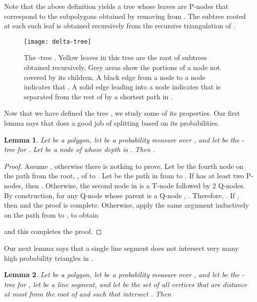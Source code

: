 \documentclass[lotsofwhite]{patmorin}
\newcommand{\figlabel}[1]{\label{fig:#1}}
\newtheorem{lem}{Lemma}{\bfseries}{\itshape}
\newcommand{\lemlabel}[1]{\label{lem:#1}}
\begin{document}
Note that the above definition yields a tree whose leaves are P-nodes
that correspond to the subpolygons   obtained by
removing  from .  The subtree rooted at each such leaf is
obtained recursively from the recursive triangulation of .

\begin{figure}
 \begin{center}\texttt{[image: delta-tree]}\end{center}
   \caption{The -tree .  Yellow leaves in this tree are the
     root of subtrees obtained recursively.  Grey areas show the
portions of a node not covered by its children. 
A black edge from a node  to a node  indicates that .  A solid edge leading into a node  indicates that 
is separated from the rest of  by a shortest path in .}
  \figlabel{delta-tree}
\end{figure}

Now that we have defined the tree , we study some of its
properties.  Our first lemma says that  does a good job of
splitting  based on its probabilities.

\begin{lem}\lemlabel{t-halving}\lemlabel{A}
Let  be a polygon, let  be a probability measure over , 
and let  be the -tree for .
Let  be a node of  whose depth is . Then .
\end{lem}

\begin{proof}
Assume , otherwise there is nothing to prove. Let  be the
fourth node on the path from the root, , of  to .  Let  be
the path in  from  to .  If  has at least two
P-nodes, then . Otherwise, the
second node in  is a T-node followed by 2 Q-nodes.  By
construction, for any Q-node  whose parent is a Q-node ,
.  Therefore, .  If , then  and the proof is complete.
Otherwise, apply the same argument inductively on the path from  to , to
obtain

and this completes the proof.
\end{proof}


Our next lemma says that a single line segment does not intersect
very many high probability triangles in .

\begin{lem}\lemlabel{t-segment-x}
Let  be a polygon, let  be a probability measure over , 
and let  be the -tree for , let  be
a line segment, and let  be the set of all vertices
 that are distance at most  from the root of  and
such that
 intersect .  Then 
\end{lem}
\end{document}
